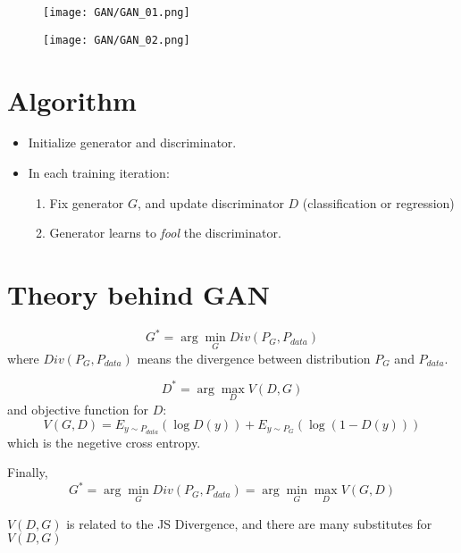 \documentclass[11pt]{book}
\begin{document}
\begin{figure}[H]
    \centering
    \texttt{[image: GAN/GAN\_01.png]}
\end{figure}

\begin{figure}[H]
    \centering
    \texttt{[image: GAN/GAN\_02.png]}
\end{figure}

\section{Algorithm}
\begin{itemize}
    \item Initialize generator and discriminator.
    \item In each training iteration:
    \begin{enumerate}
        \item Fix generator $G$, and update discriminator $D$ (classification or regression)
        \item Generator learns to \textit{fool} the discriminator.
    \end{enumerate}
\end{itemize}

\section{Theory behind GAN}
\begin{displaymath}
    G^{\ast}=\arg\min_{G} Div(P_G,P_{data})
\end{displaymath}
where $Div(P_G,P_{data})$ means the divergence between distribution $P_G$ and $P_{data}$.

\begin{displaymath}
    D^{\ast}=\arg\max_D V(D,G)
\end{displaymath}
and objective function for $D$:
\begin{displaymath}
    V(G,D)=E_{y\sim P_{data}}\left(\log D(y)\right)+E_{y\sim P_G}\left(\log(1-D(y))\right)
\end{displaymath}
which is the negetive cross entropy.

Finally,
\begin{displaymath}
    G^{\ast}=\arg\min_G Div(P_G,P_{data})=\arg\min_G\max_D V(G,D)
\end{displaymath}

$V(D,G)$ is related to the JS Divergence, and there are many substitutes for $V(D,G)$
\end{document}
